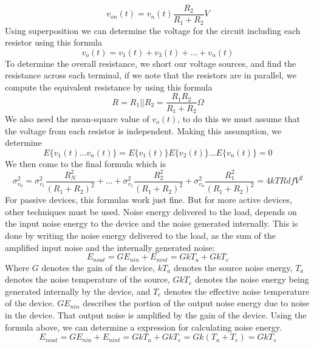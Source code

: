 \documentclass[12pt]{article}
\begin{document}
\begin{equation}
    v_{on}(t) = v_n (t) \frac{R_2}{R_1 + R_2} V
\end{equation}
Using superposition we can determine the voltage for the circuit including each resistor using this formula
\begin{equation}
    v_{o} (t) = v_1 (t) + v_3 (t) + ... + v_n (t) 
\end{equation}
To determine the overall resistance, we short our voltage sources, and find the resistance across each terminal, if we note that the resistors are in parallel, we compute the equivalent resistance by using this formula
\begin{equation}
    R = R_1 || R_2 = \frac{R_1 R_2}{R_1 + R_2} \Omega
\end{equation}
We also need the mean-square value of $v_o (t)$, to do this we must assume that the voltage from each resistor is independent. Making this assumption, we determine 
\begin{equation}
    E \{v_1 (t) ... v_n(t) \} = E\{ v_1(t)\}E\{ v_2(t)\} ... E\{ v_n(t)\} = 0
\end{equation}
We then come to the final formula which is 
\begin{equation}
    \sigma_{v_0}^{2} = \sigma_{v_1}^{2} \frac{R_N^2}{(R_1 + R_2)^2} + ... + \sigma_{v_1}^{2} \frac{R_2^2}{(R_1 + R_2)^2} + \sigma_{v_n}^{2} \frac{R_1^2}{(R_1 + R_2)^2} = 4kTRdf V^2
\end{equation}
For passive devices, this formulas work just fine. But for more active devices, other techniques must be used. Noise energy delivered to the load, depends on the input noise energy to the device and the noise generated internally. This is done by writing the noise energy delivered to the load, as the sum of the amplified input noise and the internally generated noise:
\begin{equation}
    E_{nout} = GE_{nin} + E_{nint} = GkT_a + GkT_e
\end{equation}
Where $G$ denotes the gain of the device, $kT_a$ denotes the source noise energy, $T_a$ denotes the noise temperature of the source, $GkT_e$ denotes the noise energy being generated internally by the device, and $T_e$ denotes the effective noise temperature of the device. $GE_{nin}$ describes the portion of the output noise energy due to noise in the device. That output noise is amplified by the gain of the device. Using the formula above, we can determine a expression for calculating noise energy.
\begin{equation}
    E_{nout} = GE_{nin} + E_{nint} = GkT_a + GkT_e = Gk(T_a + T_e) = GkT_s
\end{equation}
\end{document}
